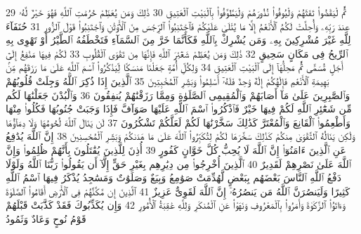 {\tiny\colorbox{cl_aya}{29}} ثُمَّ لْيَقْضُوا۟ تَفَثَهُمْ وَلْيُوفُوا۟ نُذُورَهُمْ وَلْيَطَّوَّفُوا۟ بِٱلْبَيْتِ ٱلْعَتِيقِ
{\tiny\colorbox{cl_aya}{30}} ذَٰلِكَ وَمَن يُعَظِّمْ حُرُمَٰتِ ٱللَّهِ فَهُوَ خَيْرٌ لَّهُۥ عِندَ رَبِّهِۦ وَأُحِلَّتْ لَكُمُ ٱلْأَنْعَٰمُ إِلَّا مَا يُتْلَىٰ عَلَيْكُمْ فَٱجْتَنِبُوا۟ ٱلرِّجْسَ مِنَ ٱلْأَوْثَٰنِ وَٱجْتَنِبُوا۟ قَوْلَ ٱلزُّورِ
{\tiny\colorbox{cl_aya}{31}} حُنَفَآءَ لِلَّهِ غَيْرَ مُشْرِكِينَ بِهِۦ وَمَن يُشْرِكْ بِٱللَّهِ فَكَأَنَّمَا خَرَّ مِنَ ٱلسَّمَآءِ فَتَخْطَفُهُ ٱلطَّيْرُ أَوْ تَهْوِى بِهِ ٱلرِّيحُ فِى مَكَانٍ سَحِيقٍ
{\tiny\colorbox{cl_aya}{32}} ذَٰلِكَ وَمَن يُعَظِّمْ شَعَٰٓئِرَ ٱللَّهِ فَإِنَّهَا مِن تَقْوَى ٱلْقُلُوبِ
{\tiny\colorbox{cl_aya}{33}} لَكُمْ فِيهَا مَنَٰفِعُ إِلَىٰٓ أَجَلٍ مُّسَمًّى ثُمَّ مَحِلُّهَآ إِلَى ٱلْبَيْتِ ٱلْعَتِيقِ
{\tiny\colorbox{cl_aya}{34}} وَلِكُلِّ أُمَّةٍ جَعَلْنَا مَنسَكًا لِّيَذْكُرُوا۟ ٱسْمَ ٱللَّهِ عَلَىٰ مَا رَزَقَهُم مِّنۢ بَهِيمَةِ ٱلْأَنْعَٰمِ فَإِلَٰهُكُمْ إِلَٰهٌ وَٰحِدٌ فَلَهُۥٓ أَسْلِمُوا۟ وَبَشِّرِ ٱلْمُخْبِتِينَ
{\tiny\colorbox{cl_aya}{35}} ٱلَّذِينَ إِذَا ذُكِرَ ٱللَّهُ وَجِلَتْ قُلُوبُهُمْ وَٱلصَّٰبِرِينَ عَلَىٰ مَآ أَصَابَهُمْ وَٱلْمُقِيمِى ٱلصَّلَوٰةِ وَمِمَّا رَزَقْنَٰهُمْ يُنفِقُونَ
{\tiny\colorbox{cl_aya}{36}} وَٱلْبُدْنَ جَعَلْنَٰهَا لَكُم مِّن شَعَٰٓئِرِ ٱللَّهِ لَكُمْ فِيهَا خَيْرٌ فَٱذْكُرُوا۟ ٱسْمَ ٱللَّهِ عَلَيْهَا صَوَآفَّ فَإِذَا وَجَبَتْ جُنُوبُهَا فَكُلُوا۟ مِنْهَا وَأَطْعِمُوا۟ ٱلْقَانِعَ وَٱلْمُعْتَرَّ كَذَٰلِكَ سَخَّرْنَٰهَا لَكُمْ لَعَلَّكُمْ تَشْكُرُونَ
{\tiny\colorbox{cl_aya}{37}} لَن يَنَالَ ٱللَّهَ لُحُومُهَا وَلَا دِمَآؤُهَا وَلَٰكِن يَنَالُهُ ٱلتَّقْوَىٰ مِنكُمْ كَذَٰلِكَ سَخَّرَهَا لَكُمْ لِتُكَبِّرُوا۟ ٱللَّهَ عَلَىٰ مَا هَدَىٰكُمْ وَبَشِّرِ ٱلْمُحْسِنِينَ
{\tiny\colorbox{cl_aya}{38}} إِنَّ ٱللَّهَ يُدَٰفِعُ عَنِ ٱلَّذِينَ ءَامَنُوٓا۟ إِنَّ ٱللَّهَ لَا يُحِبُّ كُلَّ خَوَّانٍ كَفُورٍ
{\tiny\colorbox{cl_aya}{39}} أُذِنَ لِلَّذِينَ يُقَٰتَلُونَ بِأَنَّهُمْ ظُلِمُوا۟ وَإِنَّ ٱللَّهَ عَلَىٰ نَصْرِهِمْ لَقَدِيرٌ
{\tiny\colorbox{cl_aya}{40}} ٱلَّذِينَ أُخْرِجُوا۟ مِن دِيَٰرِهِم بِغَيْرِ حَقٍّ إِلَّآ أَن يَقُولُوا۟ رَبُّنَا ٱللَّهُ وَلَوْلَا دَفْعُ ٱللَّهِ ٱلنَّاسَ بَعْضَهُم بِبَعْضٍ لَّهُدِّمَتْ صَوَٰمِعُ وَبِيَعٌ وَصَلَوَٰتٌ وَمَسَٰجِدُ يُذْكَرُ فِيهَا ٱسْمُ ٱللَّهِ كَثِيرًا وَلَيَنصُرَنَّ ٱللَّهُ مَن يَنصُرُهُۥٓ إِنَّ ٱللَّهَ لَقَوِىٌّ عَزِيزٌ
{\tiny\colorbox{cl_aya}{41}} ٱلَّذِينَ إِن مَّكَّنَّٰهُمْ فِى ٱلْأَرْضِ أَقَامُوا۟ ٱلصَّلَوٰةَ وَءَاتَوُا۟ ٱلزَّكَوٰةَ وَأَمَرُوا۟ بِٱلْمَعْرُوفِ وَنَهَوْا۟ عَنِ ٱلْمُنكَرِ وَلِلَّهِ عَٰقِبَةُ ٱلْأُمُورِ
{\tiny\colorbox{cl_aya}{42}} وَإِن يُكَذِّبُوكَ فَقَدْ كَذَّبَتْ قَبْلَهُمْ قَوْمُ نُوحٍ وَعَادٌ وَثَمُودُ
